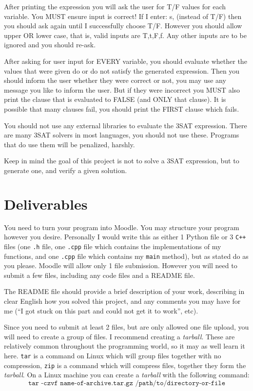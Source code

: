 \documentclass{article}
\begin{document}
After printing the expression you will ask the user for T/F values for each
variable. You MUST ensure input is correct! If I enter: s, (instead of T/F) then
you should ask again until I successfully choose T/F. However you should allow
upper OR lower case, that is, valid inputs are T,t,F,f. Any other inputs are to
be ignored and you should re-ask.

After asking for user input for EVERY variable, you should evaluate whether the
values that were given do or do not satisfy the generated expression. Then you
should inform the user whether they were correct or not, you may use any message
you like to inform the user. But if they were incorrect you MUST also print the
clause that is evaluated to FALSE (and ONLY that clause). It is possible that
many clauses fail, you should print the FIRST clause which fails.

You should not use any external libraries to evaluate the 3SAT expression. There
are many 3SAT solvers in most languages, you should not use these. Programs that
do use them will be penalized, harshly.

Keep in mind the goal of this project is not to solve a 3SAT expression, but to
generate one, and verify a given solution.

\section{Deliverables}
You need to turn your program into Moodle. You may structure your program
however you desire. Personally I would write this as either 1 Python file or 3
\texttt{C++} files (one \texttt{.h} file, one \texttt{.cpp} file which contains
the implementations of my functions, and one \texttt{.cpp} file which contains
my \texttt{main} method), but as stated do as you please. Moodle will allow only
1 file submission. However you will need to submit a few files, including any
code files and a README file. 

The README file should provide a brief description of your work, describing in
clear English how you solved this project, and any comments you may have for me 
(``I got stuck on this part and could not get it to work'', etc).

Since you need to submit at least 2 files, but are only allowed one file upload,
you will need to create a group of files. I recommend creating a \emph{tarball}.
These are relatively common throughout the programming world, so it may as well
learn it here. \texttt{tar} is a command on Linux which will group files
together with no compression, \texttt{zip} is a command which will compress
files, together they form the \emph{tarball}. On a Linux machine you can create
a \emph{tarball} with the following command:
\[
  \texttt{tar -czvf name-of-archive.tar.gz /path/to/directory-or-file}
\]
\end{document}
